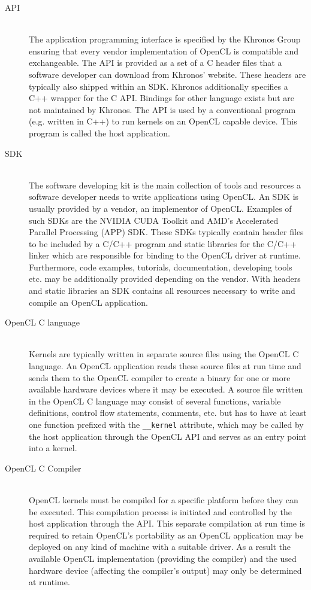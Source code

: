 \begin{description}
	\item[API] \hfill \\
	The application programming interface is specified by the Khronos Group ensuring that every vendor implementation of OpenCL is compatible and exchangeable. The API is provided as a set of a C header files that a software developer can download from Khronos' website. These headers are typically also shipped within an SDK. Khronos additionally specifies a C++ wrapper for the C API. Bindings for other language exists but are not maintained by Khronos.
	The API is used by a conventional program (e.g. written in C++) to run kernels on an OpenCL capable device. This program is called the host application.
	\item[SDK] \hfill \\
	The software developing kit is the main collection of tools and resources a software developer needs to write applications using OpenCL. An SDK is usually provided by a vendor, an implementor of OpenCL. Examples of such SDKs are the NVIDIA CUDA Toolkit and AMD's Accelerated Parallel Processing (APP) SDK. These SDKs typically contain header files to be included by a C/C++ program and static libraries for the C/C++ linker which are responsible for binding to the OpenCL driver at runtime. Furthermore, code examples, tutorials, documentation, developing tools etc. may be additionally provided depending on the vendor. With headers and static libraries an SDK contains all resources necessary to write and compile an OpenCL application.
	\item[OpenCL C language] \hfill \\
	Kernels are typically written in separate source files using the OpenCL C language. An OpenCL application reads these source files at run time and sends them to the OpenCL compiler to create a binary for one or more available hardware devices where it may be executed. A source file written in the OpenCL C language may consist of several functions, variable definitions, control flow statements, comments, etc. but has to have at least one function prefixed with the \lstinline!__kernel! attribute, which may be called by the host application through the OpenCL API and serves as an entry point into a kernel.
	\item[OpenCL C Compiler] \hfill \\
	OpenCL kernels must be compiled for a specific platform before they can be executed. This compilation process is initiated and controlled by the host application through the API. This separate compilation at run time is required to retain OpenCL's portability as an OpenCL application may be deployed on any kind of machine with a suitable driver. As a result the available OpenCL implementation (providing the compiler) and the used hardware device (affecting the compiler's output) may only be determined at runtime.

\end{description}
